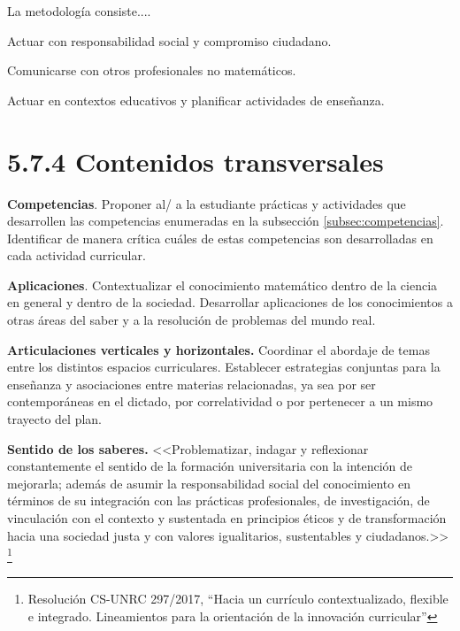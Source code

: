 \documentclass[a4paper, 12pt]{article}
\begin{document}
La metodología consiste....
 
Actuar con responsabilidad social y compromiso ciudadano.

 Comunicarse con otros profesionales no matemáticos.

Actuar en contextos educativos y planificar actividades de enseñanza.


\section*{5.7.4 Contenidos transversales}

\begin{description}
  



\item{\textbf{Competencias}.} Proponer al/ a la estudiante prácticas y actividades que desarrollen las competencias enumeradas en la subsección \ref{subsec:competencias}. Identificar de manera crítica cuáles de estas competencias son desarrolladas en cada actividad curricular.


\item{\textbf{Aplicaciones}.}  Contextualizar el conocimiento matemático dentro de la ciencia en general y dentro de la sociedad. Desarrollar aplicaciones de los conocimientos a otras áreas del saber y a la resolución de problemas del mundo real. 



\item{\textbf{Articulaciones verticales y horizontales.}} Coordinar el abordaje de  temas entre los distintos espacios curriculares. Establecer estrategias conjuntas para la enseñanza y asociaciones entre materias relacionadas, ya sea por ser contemporáneas en el dictado, por correlatividad o por pertenecer a un mismo trayecto del plan. 


\item{ \textbf{Sentido de los saberes.}} <<Problematizar, indagar y reflexionar constantemente el sentido de la formación
universitaria con la intención de mejorarla; además de asumir la responsabilidad social del
conocimiento en términos de su integración con las prácticas profesionales, de investigación, de
vinculación con el contexto y sustentada en principios éticos y de transformación hacia una
sociedad justa y con valores igualitarios, sustentables y ciudadanos.>> \footnote{Resolución CS-UNRC 297/2017, ``Hacia   un   currículo contextualizado, flexible e integrado. Lineamientos para la orientación de la innovación  curricular''}


\end{description}
\end{document}
